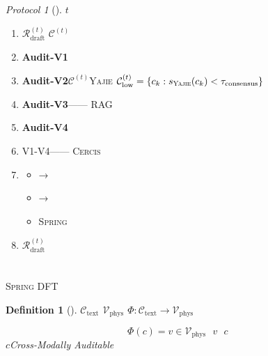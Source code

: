 \documentclass[12pt,a4paper]{article}
\newtheorem{definition}[theorem]{Definition}
\theoremstyle{remark}
\newtheorem{protocol}[theorem]{Protocol}
\newcommand{\Spring}{\textsc{Spring}}
\newcommand{\Yajie}{\textsc{Yajie}}
\newcommand{\Cercis}{\textsc{Cercis}}
\begin{document}
\begin{protocol}[]\label{prot:audit_loop}
$t$
\begin{enumerate}[label= \arabic*,leftmargin=*,itemsep=3pt]
    \item \textbf{} $\mathcal{R}_{\text{draft}}^{(t)}$  $\mathcal{C}^{(t)}$
    \item \textbf{Audit-V1}
    \item \textbf{Audit-V2}$\mathcal{C}^{(t)}$\Yajie{}
    $\mathcal{C}_{\text{low}}^{(t)} = \{c_k : s_{\Yajie}(c_k) < \tau_{\text{consensus}}\}$
    \item \textbf{Audit-V3}——
    RAG
    \item \textbf{Audit-V4}
    \item \textbf{} V1-V4——
    \Cercis{}
    \item \textbf{}
    \begin{itemize}[nosep]
        \item →
        \item →
        \item \Spring{}
    \end{itemize}
    \item \textbf{} $\mathcal{R}_{\text{draft}}^{(t)}$
\end{enumerate}
\end{protocol}

\newpage

\section{}

\subsection{}

\Spring{}
\textbf{}
DFT

\begin{definition}[]\label{def:cross_modal_mapping}
$\mathcal{C}_{\text{text}}$
$\mathcal{V}_{\text{phys}}$
$\Phi: \mathcal{C}_{\text{text}} \to \mathcal{V}_{\text{phys}}$

\begin{equation}\label{eq:cross_modal_map}
    \Phi(c) = v \in \mathcal{V}_{\text{phys}} \text{  } v \text{  } c \text{ }
\end{equation}
$c$\textbf{}Cross-Modally Auditable
\end{definition}
\end{document}
